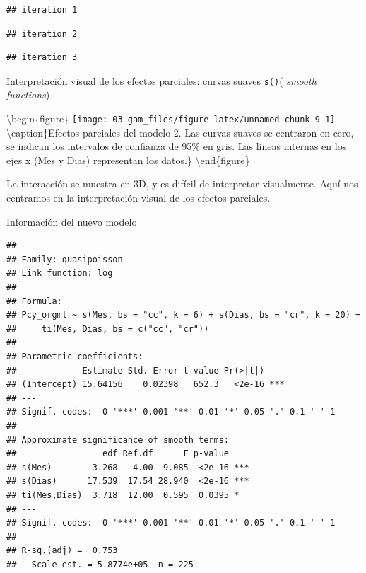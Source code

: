 \documentclass[
]{book}
\newenvironment{Shaded}{\begin{snugshade}}{\end{snugshade}}
\newcommand{\AttributeTok}[1]{\textcolor[rgb]{0.77,0.63,0.00}{#1}}
\newcommand{\DecValTok}[1]{\textcolor[rgb]{0.00,0.00,0.81}{#1}}
\newcommand{\FunctionTok}[1]{\textcolor[rgb]{0.00,0.00,0.00}{#1}}
\newcommand{\NormalTok}[1]{#1}
\newcommand{\SpecialCharTok}[1]{\textcolor[rgb]{0.00,0.00,0.00}{#1}}
\begin{document}
\begin{verbatim}
## iteration 1
\end{verbatim}

\begin{verbatim}
## iteration 2
\end{verbatim}

\begin{verbatim}
## iteration 3
\end{verbatim}

Interpretación visual de los efectos parciales: curvas suaves \texttt{s()}( \emph{smooth functions})

\begin{Shaded}
\end{Shaded}

\textbackslash begin\{figure\}
\texttt{[image: 03-gam\_files/figure-latex/unnamed-chunk-9-1]} \textbackslash caption\{Efectos parciales del modelo 2. Las curvas suaves se centraron en cero, se indican los intervalos de confianza de 95\% en gris. Las líneas internas en los ejes x (Mes y Dias) representan los datos.\}\label{fig:unnamed-chunk-9}
\textbackslash end\{figure\}

La interacción se muestra en 3D, y es difícil de interpretar visualmente. Aquí nos centramos en la interpretación visual de los efectos parciales.

Información del nuevo modelo

\begin{Shaded}
\end{Shaded}

\begin{verbatim}
## 
## Family: quasipoisson 
## Link function: log 
## 
## Formula:
## Pcy_orgml ~ s(Mes, bs = "cc", k = 6) + s(Dias, bs = "cr", k = 20) + 
##     ti(Mes, Dias, bs = c("cc", "cr"))
## 
## Parametric coefficients:
##             Estimate Std. Error t value Pr(>|t|)    
## (Intercept) 15.64156    0.02398   652.3   <2e-16 ***
## ---
## Signif. codes:  0 '***' 0.001 '**' 0.01 '*' 0.05 '.' 0.1 ' ' 1
## 
## Approximate significance of smooth terms:
##                 edf Ref.df      F p-value    
## s(Mes)        3.268   4.00  9.085  <2e-16 ***
## s(Dias)      17.539  17.54 28.940  <2e-16 ***
## ti(Mes,Dias)  3.718  12.00  0.595  0.0395 *  
## ---
## Signif. codes:  0 '***' 0.001 '**' 0.01 '*' 0.05 '.' 0.1 ' ' 1
## 
## R-sq.(adj) =  0.753   
##   Scale est. = 5.8774e+05  n = 225
\end{verbatim}
\end{document}
